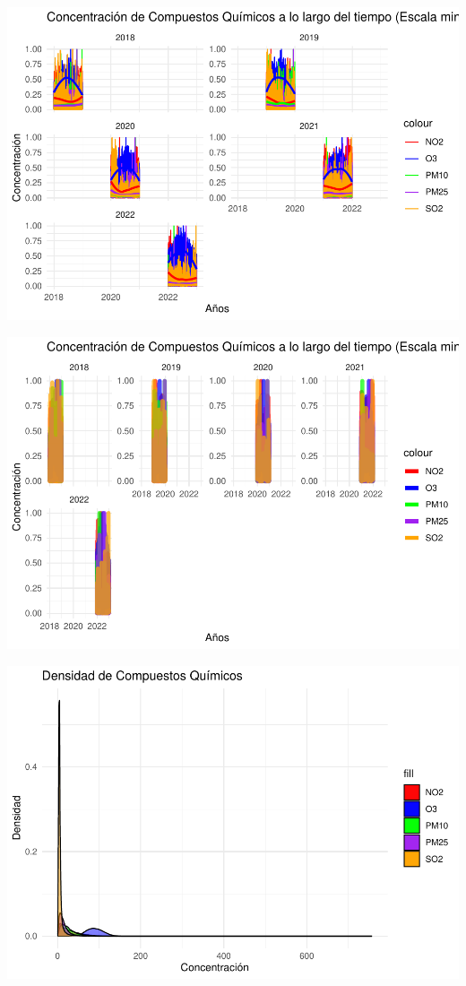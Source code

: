 \documentclass[notspecified,article,submit,moreauthors,pdftex]{Definitions/mdpi}
\begin{document}
\includegraphics{ProyectoAED2023_files/figure-latex/unnamed-chunk-24-1.pdf}

\includegraphics{ProyectoAED2023_files/figure-latex/unnamed-chunk-25-1.pdf}

\includegraphics{ProyectoAED2023_files/figure-latex/unnamed-chunk-27-1.pdf}
\end{document}
